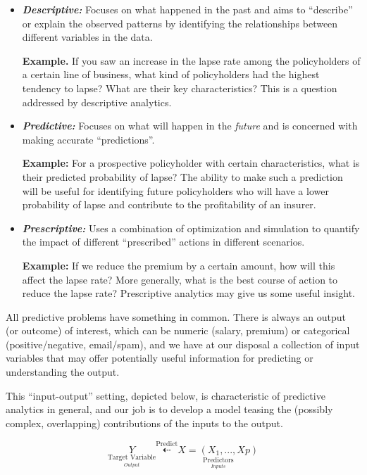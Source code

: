 \documentclass[
  10pt,
]{krantz}
\begin{document}
\begin{itemize}
\item
  \textbf{\emph{Descriptive:}} Focuses on what happened in the past and aims to
  ``describe'' or explain the observed patterns by identifying the relationships
  between different variables in the data.

  \textbf{Example.} If you saw an increase in the lapse rate among the
  policyholders of a certain line of business, what kind of policyholders had
  the highest tendency to lapse? What are their key characteristics? This is a
  question addressed by descriptive analytics.
\item
  \textbf{\emph{Predictive:}} Focuses on what will happen in the \emph{future} and is
  concerned with making accurate ``predictions''.

  \textbf{Example:} For a prospective policyholder with certain characteristics,
  what is their predicted probability of lapse? The ability to make such a
  prediction will be useful for identifying future policyholders who will have
  a lower probability of lapse and contribute to the profitability of an
  insurer.
\item
  \textbf{\emph{Prescriptive:}} Uses a combination of optimization and simulation to
  quantify the impact of different ``prescribed'' actions in different
  scenarios.

  \textbf{Example:} If we reduce the premium by a certain amount, how will this
  affect the lapse rate? More generally, what is the best course of action to
  reduce the lapse rate? Prescriptive analytics may give us some useful
  insight.
\end{itemize}

All predictive problems have something in common. There is always an output (or
outcome) of interest, which can be numeric (salary, premium) or categorical
(positive/negative, email/spam), and we have at our disposal a collection of
input variables that may offer potentially useful information for predicting or
understanding the output.

This ``input-output'' setting, depicted below, is characteristic of predictive
analytics in general, and our job is to develop a model teasing the (possibly
complex, overlapping) contributions of the inputs to the output.

\[
\underset{\underset{Output}{\text{Target Variable}}}{Y} \overset{\text{Predict}}{\underset{\text{}}{\dashleftarrow}}\underset{\underset{Inputs}{\text{Predictors}}}{X = (X_1,...,Xp)}
\]
\end{document}
